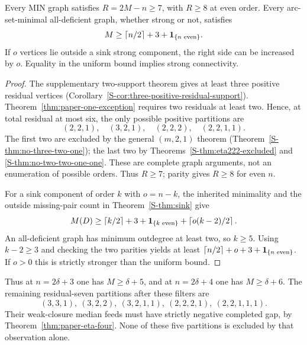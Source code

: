 \begin{theorem}\label{thm:paper-residual-seven}
Every MIN graph satisfies $R=2M-n\ge7$, with $R\ge8$ at even order.
Every arc-set-minimal all-deficient graph, whether strong or not, satisfies
\[
 M\ge\left\lceil n/2\right\rceil+3+\mathbf 1_{\{n\text{ even}\}}.
\]
If $o$ vertices lie outside a sink strong component, the right side can be
increased by $o$. Equality in the uniform bound implies strong connectivity.
\end{theorem}
\begin{proof}
The supplementary two-support theorem gives at least three positive
residual vertices (Corollary~\ref{S-cor:three-positive-residual-support}).
Theorem~\ref{thm:paper-one-exception} requires two residuals at least two.
Hence, at total residual at most six, the only possible positive partitions are
\[
 (2,2,1),\quad(3,2,1),\quad(2,2,2),\quad(2,2,1,1).
\]
The first two are excluded by the general $(m,2,1)$ theorem
(Theorem~\ref{S-thm:no-three-two-one}); the last two by
Theorems~\ref{S-thm:eta222-excluded} and \ref{S-thm:no-two-two-one-one}.
These are complete graph arguments, not an enumeration of possible orders.
Thus $R\ge7$; parity gives $R\ge8$ for even $n$.

For a sink component of order $k$ with $o=n-k$, the inherited minimality
and the outside missing-pair count in Theorem~\ref{S-thm:sink} give
\[
 M(D)\ge\left\lceil k/2\right\rceil+3+\mathbf 1_{\{k\text{ even}\}}
               +\left\lceil o(k-2)/2\right\rceil.
\]
An all-deficient graph has minimum outdegree at least two, so $k\ge5$.
Using $k-2\ge3$ and checking the two parities yields at least
$\lceil n/2\rceil+o+3+\mathbf 1_{\{n\text{ even}\}}$.
If $o>0$ this is strictly stronger than the uniform bound.
\end{proof}

Thus at $n=2\delta+3$ one has $M\ge\delta+5$, and at $n=2\delta+4$
one has $M\ge\delta+6$. The remaining residual-seven partitions after
these filters are
\[
 (3,3,1),\ (3,2,2),\ (3,2,1,1),\ (2,2,2,1),\ (2,2,1,1,1).
\]
Their weak-closure median feeds must have strictly negative completed gap,
by Theorem~\ref{thm:paper-eta-four}. None of these five partitions is
excluded by that observation alone.

